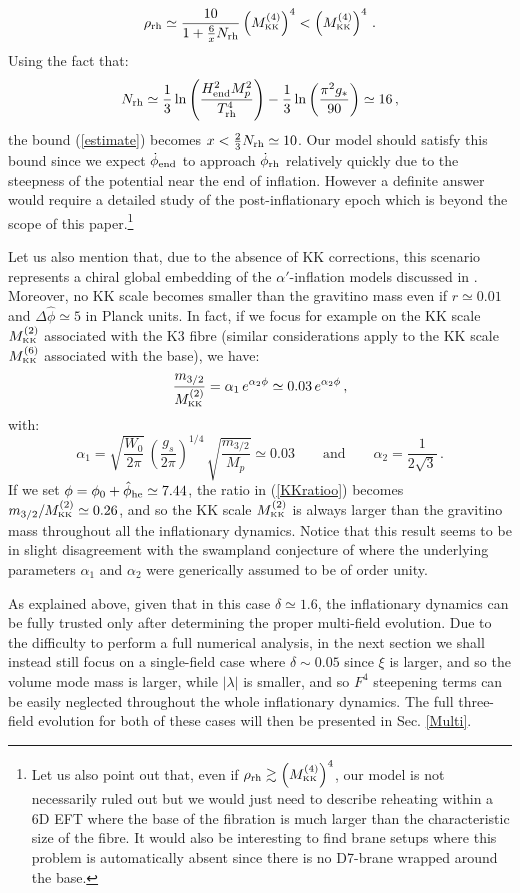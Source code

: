 \documentclass[11pt,a4paper]{article}
\newcommand{\be}{\begin{equation}}
\newcommand{\ee}{\end{equation}}
\def\KK{{\scriptscriptstyle \rm KK}}
\begin{document}
\be
\rho_{\rm rh} \simeq  \frac{10}{1+\frac6x N_{\rm rh}} \left(M_\KK^{(4)}\right)^4 < \left(M_\KK^{(4)}\right)^4\,.
\label{estimate}
\ee
Using the fact that:
\be\label{eq:N_rh}
N_{\rm rh} \simeq \frac13 \ln\left(\frac{H_{\rm end}^2 M_p^2}{T_{\rm rh}^4}\right)-\frac13\ln\left(\frac{\pi^2 g_*}{90}\right)\simeq 16\,,
\ee
the bound (\ref{estimate}) becomes $x < \tfrac{2}{3} N_{\rm rh} \simeq 10$. Our model should satisfy this bound since we expect $\dot{\phi}_{\rm end}$ to approach $\dot{\phi}_{\rm rh}$ relatively quickly due to the steepness of the potential near the end of inflation. However a definite answer would require a detailed study of the post-inflationary epoch which is beyond the scope of this paper.\footnote{Let us also point out that, even if $\rho_{\rm rh}\gtrsim \left(M_\KK^{(4)}\right)^4$, our model is not necessarily ruled out but we would just need to describe reheating within a 6D EFT where the base of the fibration is much larger than the characteristic size of the fibre. It would also be interesting to find brane setups where this problem is automatically absent since there is no D7-brane wrapped around the base.} 

Let us also mention that, due to the absence of KK corrections, this scenario represents a chiral global embedding of the $\alpha'$-inflation models discussed in \cite{Cicoli:2016chb}. Moreover, no KK scale becomes smaller than the gravitino mass even if $r\simeq 0.01$ and $\Delta \hat\phi \simeq 5$ in Planck units. In fact, if we focus for example on the KK scale $M_\KK^{(2)}$ associated with the K3 fibre (similar considerations apply to the KK scale $M_\KK^{(6)}$ associated with the base), we have:
\be
\frac{m_{3/2}}{M_\KK^{(2)}} = \alpha_1\,e^{\alpha_2 \phi}\simeq 0.03\,e^{\alpha_2 \phi}\,,
\label{KKratioo}
\ee
with:
\be
\alpha_1 = \sqrt{\frac{W_0}{2\pi}}\,\left(\frac{g_s}{2\pi}\right)^{1/4}\,\sqrt{\frac{m_{3/2}}{M_p}}\simeq 0.03 \qquad\text{and}\qquad \alpha_2 = \frac{1}{2\sqrt{3}}\,.
\ee
If we set $\phi=\phi_0 + \hat\phi_{\rm he} \simeq 7.44$, the ratio in (\ref{KKratioo}) becomes $m_{3/2}/M_\KK^{(2)} \simeq 0.26$, and so the KK scale $M_\KK^{(2)}$ is always larger than the gravitino mass throughout all the inflationary dynamics. Notice that this result seems to be in slight disagreement with the swampland conjecture of \cite{Klaewer:2016kiy, Blumenhagen:2017cxt} where the underlying parameters $\alpha_1$ and $\alpha_2$ were generically assumed to be of order unity. 

As explained above, given that in this case $\delta\simeq 1.6$, the inflationary dynamics can be fully trusted only after determining the proper multi-field evolution. Due to the difficulty to perform a full numerical analysis, in the next section we shall instead still focus on a single-field case where $\delta\sim 0.05$ since $\xi$ is larger, and so the volume mode mass is larger, while $|\lambda|$ is smaller, and so $F^4$ steepening terms can be easily neglected throughout the whole inflationary dynamics. The full three-field evolution for both of these cases will then be presented in Sec. \ref{Multi}.
\end{document}
